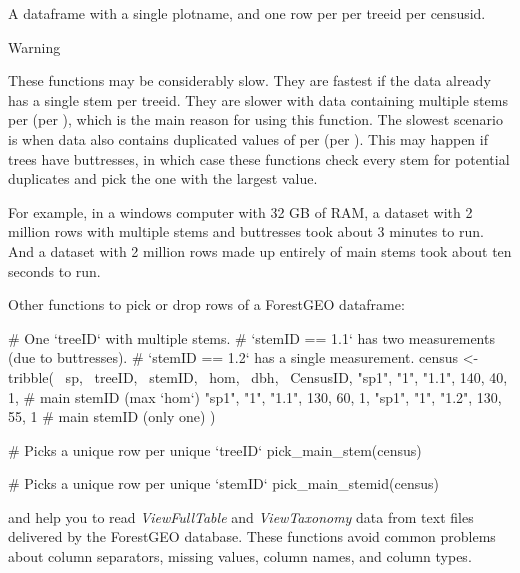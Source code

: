 \documentclass[a4paper]{book}
\begin{document}
%
\begin{Value}
A dataframe with a single plotname, and one row per per treeid per
censusid.
\end{Value}
%
\begin{Section}{Warning}

These functions may be considerably slow. They are fastest if the data
already has a single stem per treeid. They are slower with data containing
multiple stems per  (per ), which is the main reason for
using this function. The slowest scenario is when data also contains
duplicated values of  per  (per ). This may
happen if trees have buttresses, in which case these functions check
every stem for potential duplicates and pick the one with the largest 
value.

For example, in a windows computer with 32 GB of RAM, a dataset with 2
million rows with multiple stems and buttresses took about 3 minutes to run.
And a dataset with 2 million rows made up entirely of main stems took about
ten seconds to run.
\end{Section}
%
\begin{SeeAlso}\relax
Other functions to pick or drop rows of a ForestGEO dataframe: 
\end{SeeAlso}
%
\begin{Examples}
\begin{ExampleCode}
# One `treeID` with multiple stems. 
# `stemID == 1.1` has two measurements (due to buttresses).
# `stemID == 1.2` has a single measurement.
census <- tribble(
    ~sp, ~treeID, ~stemID,  ~hom, ~dbh, ~CensusID,
  "sp1",     "1",   "1.1",   140,   40,         1,  # main stemID (max `hom`)
  "sp1",     "1",   "1.1",   130,   60,         1,  
  "sp1",     "1",   "1.2",   130,   55,         1   # main stemID (only one)
)

# Picks a unique row per unique `treeID`
pick_main_stem(census)

# Picks a unique row per unique `stemID`
pick_main_stemid(census)

\end{ExampleCode}
\end{Examples}
%
\begin{Description}\relax
{} and  help you to read \emph{ViewFullTable} and
\emph{ViewTaxonomy} data from text files delivered by the ForestGEO database.
These functions avoid common problems about column separators, missing
values, column names, and column types.
\end{Description}
\end{document}
